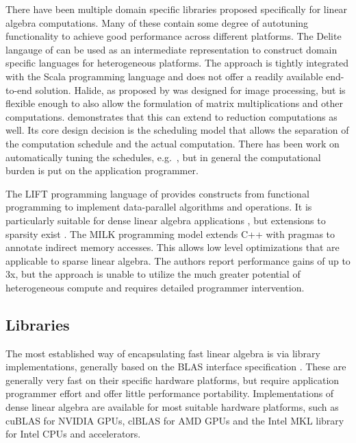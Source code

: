     There have been multiple domain specific libraries proposed specifically
    for linear algebra computations.
    Many of these contain some degree of autotuning functionality to achieve
    good performance across different platforms.
    The Delite langauge of \citet{Sujeeth:2014:DCA:2601432.2584665} can be used
    as an intermediate representation to construct domain specific languages for
    heterogeneous platforms.
    The approach is tightly integrated with the Scala programming language
    and does not offer a readily available end-to-end solution.
    Halide, as proposed by \citet{Ragan-Kelley:2013:HLC:2499370.2462176}
    was designed for image processing, but is flexible enough to also allow the 
    formulation of matrix multiplications and other computations.
    \citet{Suriana:2017:PAR:3049832.3049863} demonstrates that this can extend
    to reduction computations as well.
    Its core design decision is the scheduling model that allows the separation
    of the computation schedule and the actual computation.
    There has been work on automatically tuning the schedules, e.g.\ 
    \citet{Mullapudi:2016:ASH:2897824.2925952}, but in general the computational
    burden is put on the application programmer.

    The LIFT programming language of \citet{Steuwer:2015:GPP:2858949.2784754}
    provides constructs from functional programming to implement data-parallel
    algorithms and operations.
    It is particularly suitable for dense linear algebra applications
    \citep{Steuwer:2016:MMB:2968455.2968521}, but extensions to sparsity exist
    \citep{b5f556d505d746109608f8db3cbce4ac}.
    The MILK programming model \citep{Kiriansky:2016:OIM:2967938.2967948}
    extends C++ with pragmas to annotate indirect memory accesses.
    This allows low level optimizations that are applicable to sparse linear
    algebra.
    The authors report performance gains of up to 3x, but the approach is unable
    to utilize the much greater potential of heterogeneous compute and requires
    detailed programmer intervention.

\subsection{Libraries}

    The most established way of encapsulating fast linear algebra is via
    library implementations, generally based on the BLAS interface
    specification \cite{2002:USB:567806.567807}.
    These are generally very fast on their specific hardware platforms, but
    require application programmer effort and offer little performance portability.
    Implementations of dense linear algebra are available for most suitable
    hardware platforms, such as cuBLAS \cite{cublas} for NVIDIA GPUs, clBLAS
    \cite{clblas} for AMD GPUs and the Intel MKL library \cite{mkl} for Intel
    CPUs and accelerators.

